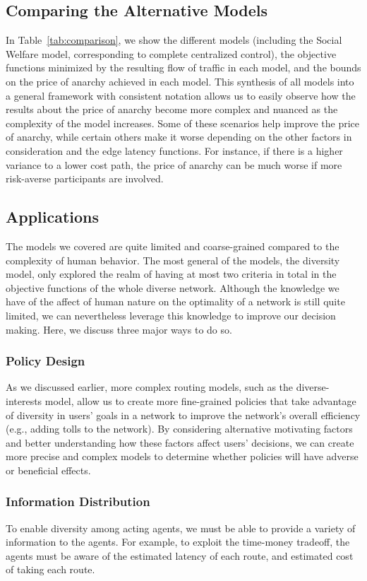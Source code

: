 \subsection{Comparing the Alternative Models}
In Table~\ref{tab:comparison}, we show the different models (including the Social Welfare model, corresponding to complete centralized control), the objective functions minimized 
by the resulting flow of traffic in each model, and the bounds on the price of anarchy achieved in each model. This synthesis of all models into a general framework with consistent notation allows us to easily observe how the results about the price of anarchy become more complex and nuanced as the complexity of the model increases. Some of these scenarios help improve the price of anarchy, while certain others make it worse depending on the other factors in
consideration and the edge latency functions. For instance, if there is a higher variance to a lower cost path, the price of anarchy can be much worse if more risk-averse participants are involved.

\subsection{Applications}
The models we covered are quite limited and coarse-grained compared to the complexity of human behavior. The most general of the models, the diversity model, only explored the realm of having at most two criteria in total in the objective functions of the whole diverse network.
Although the knowledge we have of the affect of human nature on the optimality of a network is still quite limited, we can nevertheless leverage this knowledge to improve our decision making. Here, we discuss three major ways to do so.

\subsubsection{Policy Design}
As we discussed earlier, more complex routing models, such as the diverse-interests model, allow us to create more fine-grained policies that take advantage of diversity in users' goals in a network to improve the network's overall efficiency (e.g., adding tolls to the network).
By considering alternative motivating factors and better understanding how these factors affect users' decisions, we can create more precise and complex models to determine whether policies will have adverse or beneficial effects.

\subsubsection{Information Distribution}
To enable diversity among acting agents, we must be able to provide a variety of information to the agents. For example, to exploit the time-money tradeoff, the agents must be aware of the estimated latency of each route, and estimated cost of taking each route. 

